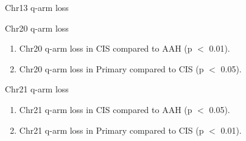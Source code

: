 \documentclass{beamer}
\begin{document}
\begin{frame}[allowframebreaks]
\begin{block}{Chr13 q-arm loss}
                    \begin{table}
                        \caption{CGC Tier1 genes in Chr13 q-arm}
                        \resizebox{\linewidth}{!}
                        {}
                    \end{table}
                \end{block}

                \begin{block}{Chr20 q-arm loss}
                    \begin{enumerate}
                        \item Chr20 q-arm loss in CIS compared to AAH (p $<$ 0.01).
                        \item Chr20 q-arm loss in Primary compared to CIS (p $<$ 0.05).
                    \end{enumerate}

                    \begin{table}
                        \caption{CGC Tier1 genes in Chr20 q-arm}
                        \resizebox{\linewidth}{!}
                        {}
                    \end{table}
                \end{block}

                \begin{block}{Chr21 q-arm loss}
                    \begin{enumerate}
                        \item Chr21 q-arm loss in CIS compared to AAH (p $<$ 0.05).
                        \item Chr21 q-arm loss in Primary compared to CIS (p $<$ 0.01).
                    \end{enumerate}

                    \begin{table}
                        \caption{CGC Tier1 genes in Chr21 q-arm}
                        \resizebox{\linewidth}{!}
                        {}
                    \end{table}
                \end{block}
            \end{frame}
\end{document}
